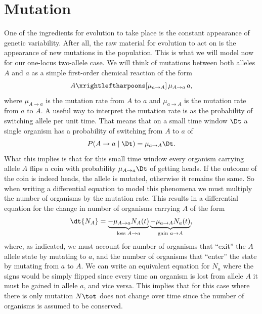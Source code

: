 \section{Mutation}

One of the ingredients for evolution to take place is the constant appearance
of genetic variability. After all, the raw material for evolution to act on is
the appearance of new mutations in the population. This is what we will model
now for our one-locus two-allele case. We will think of mutations between both
alleles $A$ and $a$ as a simple first-order chemical reaction of the form
\begin{equation}
  A \xrightleftharpoons[\mu_{a\rightarrow A}]
  {\,\mu_{A\rightarrow a}\,} a,
\end{equation}
where $\mu_{A\rightarrow a}$ is the mutation rate from $A$ to $a$ and 
$\mu_{a\rightarrow A}$ is the mutation rate from $a$ to $A$. A useful way to
interpret the mutation rate is as the probability of switching allele per unit
time. That means that on a small time window $\Dt$ a single organism has a
probability of switching from $A$ to $a$ of
\begin{equation}
  P(A \rightarrow a \mid \Dt) = \mu_{a\rightarrow A} \Dt.
\end{equation}
What this implies is that for this small time window every organism carrying
allele $A$ flips a coin with probability $\mu_{A\rightarrow a} \Dt$ of getting
heads. If the outcome of the coin is indeed heads, the allele is mutated,
otherwise it remains the same. So when writing a differential equation to model
this phenomena we must multiply the number of organisms by the mutation rate.
This results in a differential equation for the change in number of organisms
carrying $A$ of the form
\begin{equation}
  \dt{N_A} = 
  \underbrace{- \mu_{A\rightarrow a} N_A(t)}_{\text{loss } A \rightarrow a}
  \underbrace{- \mu_{a\rightarrow A} N_a(t)}_{\text{gain } a \rightarrow A},
\end{equation}
where, as indicated, we must account for number of organisms that ``exit'' the
$A$ allele state by mutating to $a$, and the number of organisms that ``enter''
the state by mutating from $a$ to $A$. We can write an equivalent equation for
$N_a$ where the signs would be simply flipped since every time an organism is
lost from allele $A$ it must be gained in allele $a$, and vice versa. This
implies that for this case where there is only mutation $N\tot$ does not change
over time since the number of organisms is assumed to be conserved.

